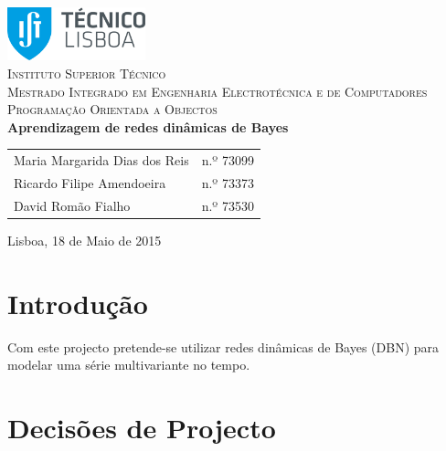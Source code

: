 \documentclass[10pt]{article}
\numberwithin{equation}{section}
\begin{document}
\begin{titlepage}
\begin{center}

\hfill \break
\hfill \break

\includegraphics[width=0.3\textwidth]{./logo}~\\[1cm]

\textsc{\LARGE Instituto Superior Técnico}\\[0.25cm]
\textsc{\Large Mestrado Integrado em Engenharia Electrotécnica e de Computadores}\\[1.8cm]
\textsc{\huge Programação Orientada a Objectos}\\[0.25cm]

{\huge \bfseries Aprendizagem de redes dinâmicas de Bayes \\[1cm]}

\begin{tabular}{ l l }
Maria Margarida Dias dos Reis & \hspace{2mm} n.º 73099 \\
Ricardo Filipe Amendoeira & \hspace{2mm} n.º 73373 \\
David Romão Fialho & \hspace{2mm} n.º 73530
\end{tabular}

\vfill

{\large Lisboa, 18 de Maio de 2015} 

\end{center}
\end{titlepage}

\clearpage

\tableofcontents
\pagebreak

\clearpage
{}

\section{Introdução}

Com este projecto pretende-se utilizar redes dinâmicas de Bayes (DBN) para modelar uma série multivariante no tempo. 

\section{Decisões de Projecto}
\end{document}
